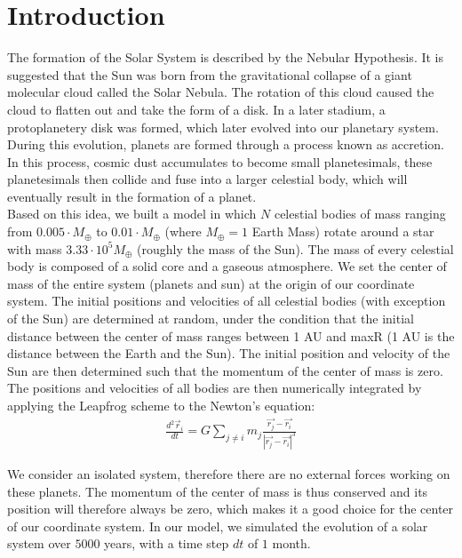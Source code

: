 \section{Introduction}
The formation of the Solar System is described by the Nebular Hypothesis. It is suggested that the Sun was born from the gravitational collapse of a giant molecular cloud called the Solar Nebula. 
The rotation of this cloud caused the cloud to flatten out and take the form of a disk. In a later stadium, a protoplanetery disk was formed, which later evolved into our planetary system.
During this evolution, planets are formed through a process known as accretion.
In this process, cosmic dust accumulates to become small planetesimals, these planetesimals then collide and fuse into a larger celestial body, which will eventually result in the formation of a planet.\\

Based on this idea, we built a model in which \(N\) celestial bodies of mass ranging from $0.005\cdot M_{\oplus}$ to $0.01\cdot M_{\oplus}$ (where $M_{\oplus}=1$ Earth Mass) rotate around a star with mass $3.33\cdot 10^5 M_{\oplus}$ (roughly the mass of the Sun).
The mass of every celestial body is composed of a solid core and a gaseous atmosphere.
We set the center of mass of the entire system (planets and sun) at the origin of our coordinate system. 
The initial positions and velocities of all celestial bodies (with exception of the Sun) are determined at random, under the condition that the initial distance between the center of mass ranges between 1 AU and  maxR (1 AU is the distance between the Earth and the Sun). 
The initial position and velocity of the Sun are then determined such that the momentum of the center of mass is zero. 
The positions and velocities of all bodies are then numerically integrated by applying the Leapfrog scheme to the Newton's equation:
\begin{align}
\frac{d^2\vec{r}_i}{dt}=G\sum_{j\neq i}m_j\frac{\vec{r_j}-\vec{r_i}}{|\vec{r_j}-\vec{r_i}|^3}
\end{align}

We consider an isolated system, therefore there are no external forces working on these planets. 
The momentum of the center of mass is thus conserved and its position will therefore always be zero, which makes it a good choice for the center of our coordinate system. 
In our model, we simulated the evolution of a solar system over $5000$ years, with a time step $dt$ of $1$ month.\\

